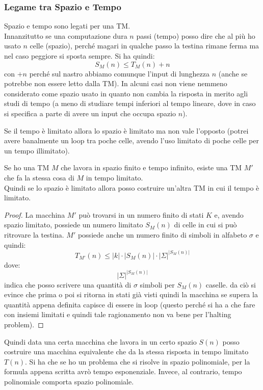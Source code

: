 \subsubsection{Legame tra Spazio e Tempo}
Spazio e tempo sono legati per una TM.\\
Innanzitutto se una computazione dura $n$ passi (tempo) posso dire che al più ho
usato $n$ celle (spazio), perché magari in qualche passo la testina rimane ferma
ma nel caso peggiore si sposta sempre. Si ha quindi:
\[S_M(n)\leq T_M(n)+n\]
con $+n$ perché sul nastro abbiamo comunque l'input di lunghezza $n$ (anche se
potrebbe non essere letto dalla TM). In alcuni casi non viene nemmeno
considerato come spazio usato in quanto non cambia la risposta in merito agli
studi di tempo (a meno di studiare tempi inferiori al tempo lineare, dove in
caso si specifica a parte di avere un input che occupa spazio $n$).
\begin{definizione}
  Se il tempo è limitato allora lo spazio è limitato ma non vale l'opposto
  (potrei avere banalmente un loop tra poche celle, avendo l'uso limitato di
  poche celle per un tempo illimitato).
\end{definizione}
\begin{definizione}
  Se ho una TM $M$ che lavora in spazio finito e tempo infinito, esiste una TM
  $M'$ che fa la stessa cosa di $M$ in tempo limitato.\\
  Quindi se lo spazio è limitato allora posso costruire un'altra TM in cui il tempo è limitato.
\end{definizione}
\begin{proof}
  La macchina $M'$ può trovarsi in un numero finito di stati $K$ e, avendo spazio limitato, possiede un numero limitato $S_M(n)$ di celle in cui si può ritrovare la testina. $M'$ possiede anche un numero finito di simboli in alfabeto $\sigma$ e quindi: 
  \[T_{M'}(n)\leq|k|\cdot |S_M(n)|\cdot |\Sigma|^{|S_M(n)|}\]
  dove:   \[ |\Sigma|^{|S_M(n)|} \] indica che posso scrivere una quantità di $\sigma$ simboli per $S_M(n)$ caselle.
  da ciò si evince che prima o poi si ritorna in stati già visti quindi la macchina se supera
  la quantità appena definita capisce di essere in loop (questo perché si ha a
  che fare con insiemi limitati e quindi tale ragionamento non va bene per
  l'halting problem).
\end{proof}
Quindi data una certa macchina che lavora in un certo spazio $S(n)$ posso
costruire una macchina equivalente che da la stessa risposta in tempo limitato
$T(n)$. Si ha che se ho un problema che si risolve in spazio polinomiale, per
la formula appena scritta avrò tempo esponenziale. Invece, al contrario, tempo
polinomiale comporta spazio polinomiale.
